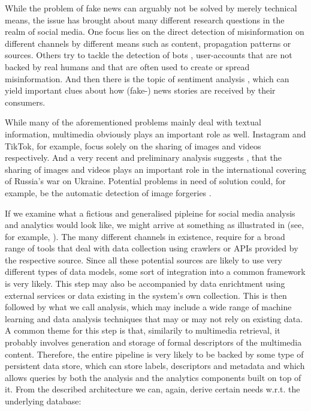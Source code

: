 While the problem of fake news can arguably not be solved by merely technical means, the issue has brought about many different research questions in the realm of social media. One focus lies on the direct detection of misinformation on different channels \cite{Zhou:2020Survey} by different means such as content, propagation patterns or sources. Others try to tackle the detection of bots \cite{Cresci:2020Decade}, user-accounts that are not backed by real humans and that are often used to create or spread misinformation. And then there is the topic of sentiment analysis \cite{Yue:2019Survey}, which can yield important clues about how (fake-) news stories are received by their consumers.

While many of the aforementioned problems mainly deal with textual information, multimedia obviously plays an important role as well. Instagram and TikTok, for example, focus solely on the sharing of images and videos respectively. And a very recent and preliminary analysis suggests \cite{Ciuriak:2022Role}, that the sharing of images and videos plays an important role in the international covering of Russia's war on Ukraine. Potential problems in need of solution could, for example, be the automatic detection of image forgeries \cite{Farid:2009Image}.

If we examine what a fictious and generalised pipleine for social media analysis and analytics would look like, we might arrive at something as illustrated in  (see, for example, \cite{Cui:2019Defend,Yang:2019XFake,Bagade:2020Kauwa}). The many different channels in existence, require for a broad range of tools that deal with data collection using crawlers or APIs provided by the respective source. Since all these potential sources are likely to use very different types of data models, some sort of integration into a common framework is very likely. This step may also be accompanied by data enrichtment using external services or data existing in the system's own collection. This is then followed by what we call analysis, which may include a wide range of machine learning and data analysis techniques that may or may not rely on existing data. A common theme for this step is that, similarily to multimedia retrieval, it probably involves generation and storage of formal descriptors of the multimedia content. Therefore, the entire pipeline is very likely to be backed by some type of persistent data store, which can store labels, descriptors and metadata and which allows queries by both the analysis and the analytics components built on top of it. From the described architecture we can, again, derive certain needs w.r.t. the underlying database: 

